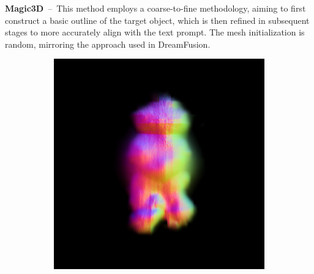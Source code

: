 
\textbf{Magic3D}~--~This method employs a coarse-to-fine methodology, aiming to first construct a basic outline of the target object, which is then refined in subsequent stages to more accurately align with the text prompt. The mesh initialization is random, mirroring the approach used in DreamFusion.

\begin{figure}[H]
    \centering
    \begin{subfigure}[b]{0.15\textwidth}
        \centering
        \fontsize{9pt}{7pt}\selectfont{}\vspace{3cm}
        \fontsize{9pt}{7pt}\selectfont{}\vspace{2.85cm}
        \fontsize{9pt}{7pt}\selectfont{}\vspace{1.95cm}
    \end{subfigure}
    \begin{subfigure}[b]{0.2\textwidth}
        \centering
        \includegraphics[width=\textwidth]{figures/generationProcess/magic3D_coarse_robot_0_part2.png}

\end{subfigure}
\end{figure}
